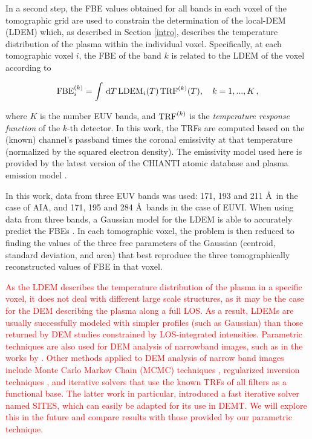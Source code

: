 \documentclass[namedreferences]{solarphysics}
\def\edit#1{\textcolor{Red}{#1}}
\newcommand{\LDEM}{{\rm LDEM}}
\newcommand{\FBE}{{\rm FBE}}
\newcommand{\TRF}{{\rm TRF}}
\begin{document}
\begin{article}
{In a second step, the FBE values obtained for all bands in each voxel {of the tomographic grid are used to constrain the determination of the local-DEM (LDEM) which, as described in Section \ref{intro}, describes the temperature distribution of the plasma within the individual voxel.} Specifically, at each tomographic voxel $i$, the FBE of the band $k$ is related to the LDEM of the voxel according to}

\begin{equation}\label{fbeldem}
\FBE_i^{(k)}  = \int\,\textrm{d}T\,\LDEM_i(T)\,{\TRF}^{(k)}(T), \ \ \ {k=1,...,K} \,,
\end{equation}

\noindent
{where $K$ is the number EUV bands, and $\TRF^{(k)}$ is the \emph{temperature response function} of the $k$-th detector. In this work, the TRFs are computed based on the (known) channel’s passband times the coronal emissivity at that temperature (normalized by the squared electron density). The emissivity model used here is provided by the latest version of the CHIANTI atomic database and plasma emission model \citep{delzanna_2015,landi_2013}.}

{In this work,} data from three EUV bands {was used:} 171, 193 and {211 \AA\ in} {the} case of AIA, and 171, 195 and {284 \AA\ bands} in {the} case of EUVI. When using data from {three bands}, a Gaussian model for the LDEM is able to accurately predict {the FBEs \citep{nuevo_2015}}. In each tomographic voxel, the problem is then reduced to finding the values of the three free parameters of the Gaussian (centroid, standard deviation, and area) that best reproduce the three tomographically reconstructed values of FBE in that voxel.

\edit{As the LDEM describes the temperature distribution of the plasma in a specific voxel, it does not deal with different large scale structures, as it may be the case for the DEM describing the plasma along a full LOS. As a result, LDEMs are usually successfully modeled with simpler profiles (such as Gaussian) than those returned by DEM studies constrained by LOS-integrated intensities. Parametric techniques are also used for DEM analysis of narrowband images, such as in the works by \citet{aschwanden_2011,plowman_2013,delzanna_2013}. Other methods applied to DEM analysis of narrow band images include Monte Carlo Markov Chain (MCMC) techniques \citep{schmeltz_2016}, regularized inversion techniques \citep{hannah_2012}, and iterative solvers \citep{pickering_2019,morgan_2019} that use the known TRFs of all filters as a functional base. The latter work in particular, introduced a fast iterative solver named SITES, which can easily be adapted for its use in DEMT. We will explore this in the future and compare results with those provided by our parametric technique.} 


\end{article}
\end{document}
